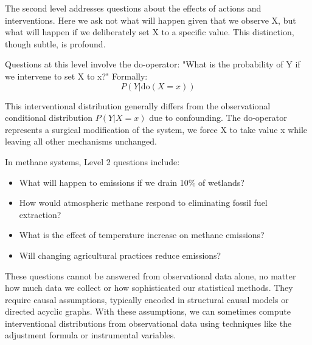 The second level addresses questions about the effects of actions and interventions. Here we ask not what will happen given that we observe X, but what will happen if we deliberately set X to a specific value. This distinction, though subtle, is profound.

Questions at this level involve the do-operator: "What is the probability of Y if we intervene to set X to x?" Formally:
\begin{equation}
P(Y|\text{do}(X=x))
\end{equation}

This interventional distribution generally differs from the observational conditional distribution $P(Y|X=x)$ due to confounding. The do-operator represents a surgical modification of the system, we force X to take value x while leaving all other mechanisms unchanged.

In methane systems, Level 2 questions include:
\begin{itemize}
\item What will happen to emissions if we drain 10\% of wetlands?
\item How would atmospheric methane respond to eliminating fossil fuel extraction?
\item What is the effect of temperature increase on methane emissions?
\item Will changing agricultural practices reduce emissions?
\end{itemize}

These questions cannot be answered from observational data alone, no matter how much data we collect or how sophisticated our statistical methods. They require causal assumptions, typically encoded in structural causal models or directed acyclic graphs. With these assumptions, we can sometimes compute interventional distributions from observational data using techniques like the adjustment formula or instrumental variables.


